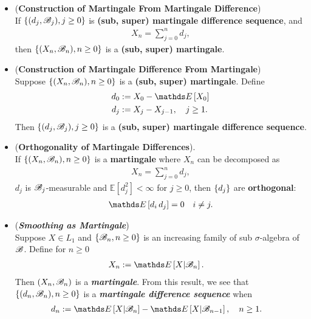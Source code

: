 \documentclass[11pt]{article}
\begin{document}
\begin{itemize}
\item \begin{proposition} (\textbf{Construction of Martingale From Martingale Difference})\citep{resnick2013probability}\\
If $\left\{(d_j, {\mathscr B}_j), j \ge 0\right\}$ is \textbf{(sub, super) martingale difference sequence}, and
\begin{align*}
X_n = \sum_{j=0}^{n} d_j, 
\end{align*} then $\left\{(X_n, {\mathscr B}_n), n \ge 0\right\}$ is a \textbf{(sub, super) martingale}.
\end{proposition}

\item \begin{proposition} (\textbf{Construction of Martingale Difference From Martingale}) \citep{resnick2013probability}\\
Suppose $\left\{(X_n, {\mathscr B}_n), n \ge 0\right\}$ is a \textbf{(sub, super) martingale}. Define
\begin{align*}
d_0&:= X_0 - \E{}{X_0}\\
d_j &:= X_j - X_{j-1}, \quad j\ge 1.
\end{align*}
Then $\left\{(d_j, {\mathscr B}_j), j \ge 0\right\}$ is a \textbf{(sub, super) martingale difference sequence}.
\end{proposition}

\item \begin{proposition} (\textbf{Orthogonality of Martingale Differences}). \citep{resnick2013probability}\\
If $\left\{(X_n, {\mathscr B}_n), n \ge 0\right\}$ is a \textbf{martingale} where $X_n$ can be decomposed as
\begin{align*}
X_n = \sum_{j=0}^{n} d_j, 
\end{align*}  $d_j$ is ${\mathscr B}_j$-measurable and  $\mathds{E}[d_j^2] < \infty$ for $j \ge 0$, then $\left\{d_j\right\}$ are \textbf{orthogonal}:
\begin{align*}
\E{}{d_i\,d_j} = 0 \quad i \neq j.
\end{align*}
\end{proposition}

\item \begin{example} (\textbf{\emph{Smoothing as Martingale}})\\
Suppose $X \in L_1$ and $\left\{{\mathscr B}_n, n \ge 0\right\}$ is an increasing family of sub $\sigma$-algebra of ${\mathscr B}$. Define for $n \ge 0$
\begin{align*}
X_n &:= \E{}{X | \srB_n}.
\end{align*}
Then $(X_n, {\mathscr B}_n)$ is a \emph{\textbf{martingale}}. From this result, we see that $\left\{(d_n, {\mathscr B}_n), n \ge 0\right\}$ is a \emph{\textbf{martingale difference sequence}} when 
\begin{align}
d_n &:= \E{}{X | \srB_n} - \E{}{X | \srB_{n-1}}, \quad n\ge 1. \label{eqn: smoothing_martingale_difference}
\end{align}
\end{example}


\end{itemize}
\end{document}
